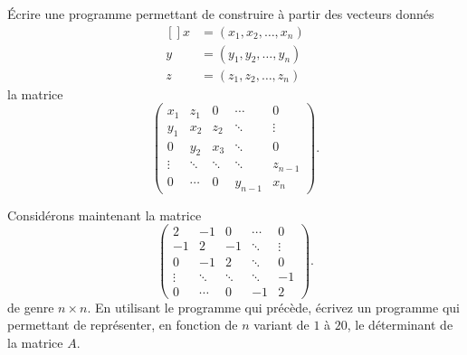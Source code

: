 \begin{exercice}\label{exoSC_serie5-0002}

Écrire une programme permettant de construire à partir des vecteurs donnés
\begin{equation}
	\begin{aligned}[]
		x&=(x_1,x_2,\ldots,x_n)\\
		y&=(y_1,y_2,\ldots,y_n)\\
		z&=(z_1,z_2,\ldots,z_n)
	\end{aligned}
\end{equation}
la matrice
\begin{equation}
	\begin{pmatrix}
		x_1	&	z_1	&	0	&	\cdots	&	0\\	
		y_1	&	x_2	&	z_2	&	\ddots	&	\vdots\\	
		0	&	y_2	&	x_3	&	\ddots	&	0\\	
		\vdots	&	\ddots	&	\ddots	&	\ddots	&	z_{n-1}\\	
		0	&	\cdots	&	0	&	y_{n-1}	&	x_n	
	\end{pmatrix}.
\end{equation}

Considérons maintenant la matrice
\begin{equation}
	\begin{pmatrix}
		2	&	-1	&	0	&	\cdots	&	0\\	
		-1	&	2	&	-1	&	\ddots	&	\vdots\\	
		0	&	-1	&	2	&	\ddots	&	0\\	
		\vdots	&	\ddots	&	\ddots	&	\ddots	&	-1\\	
		0	&	\cdots	&	0	&	-1	&	2
	\end{pmatrix}.
\end{equation}
de genre $n\times n$. En utilisant le programme qui précède, écrivez un programme qui permettant de représenter, en fonction de $n$ variant de $1$ à $20$, le déterminant de la matrice $A$.


\end{exercice}
